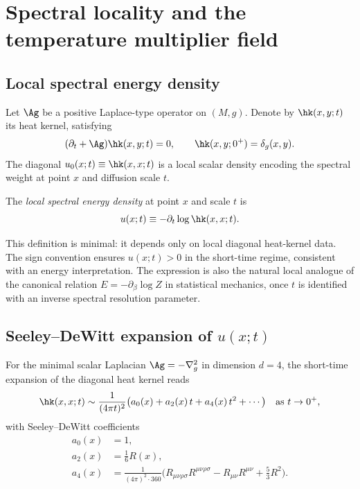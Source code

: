 \section{Spectral locality and the temperature multiplier field}
  \label{sec:spectral-locality}

  \subsection{Local spectral energy density}
    \label{subsec:local-density}

    Let $\Ag$ be a positive Laplace-type operator on $(M,g)$.
    Denote by $\hk(x,y;t)$ its heat kernel, satisfying
    \begin{equation}
      (\partial_t + \Ag)\hk(x,y;t) = 0,
      \qquad
      \hk(x,y;0^+) = \delta_g(x,y).
      \label{eq:heat-eq}
    \end{equation}
    The diagonal $u_0(x;t) \equiv \hk(x,x;t)$ is a local scalar density encoding
    the spectral weight at point $x$ and diffusion scale $t$.

    \begin{definition}
      \label{def:u}
      The \emph{local spectral energy density} at point $x$ and scale $t$ is
      \begin{equation}
        u(x;t) \equiv -\partial_t \log \hk(x,x;t).
        \label{eq:u-def}
      \end{equation}
    \end{definition}

    This definition is minimal: it depends only on local diagonal heat-kernel data.
    The sign convention ensures $u(x;t) > 0$ in the short-time regime, consistent with
    an energy interpretation.
    The expression is also the natural local analogue of the canonical relation
    $E = -\partial_\beta \log Z$ in statistical mechanics, once $t$ is identified with
    an inverse spectral resolution parameter.

  \subsection{Seeley--DeWitt expansion of \texorpdfstring{$u(x;t)$}{u(x;t)}}
    \label{subsec:SDW-expansion}

    For the minimal scalar Laplacian $\Ag = -\nabla_g^2$ in dimension $d=4$, the
    short-time expansion of the diagonal heat kernel reads~\cite{Vassilevich2003,
  Gilkey1995}
    \begin{equation}
      \hk(x,x;t) \sim \frac{1}{(4\pi t)^2}
      \bigl(a_0(x) + a_2(x)\,t + a_4(x)\,t^2 + \cdots\bigr)
      \quad\text{as }t\to 0^+,
      \label{eq:hk-expansion}
    \end{equation}
    with Seeley--DeWitt coefficients
    \begin{align}
      a_0(x) &= 1, \label{eq:a0}\\
      a_2(x) &= \tfrac{1}{6}R(x), \label{eq:a2}\\
      a_4(x) &= \frac{1}{(4\pi)^2\cdot 360}
      \bigl(R_{\mu\nu\rho\sigma}R^{\mu\nu\rho\sigma}
      - R_{\mu\nu}R^{\mu\nu} + \tfrac{5}{3}R^2\bigr). \label{eq:a4}
    \end{align}

